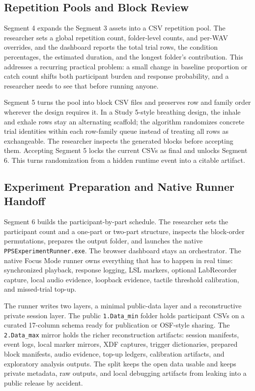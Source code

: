 \documentclass[pdflatex,sn-apa]{sn-jnl}
\newcommand{\code}[1]{\texttt{#1}}
\begin{document}
\subsection{Repetition Pools and Block Review}

Segment 4 expands the Segment 3 assets into a CSV repetition pool. The researcher sets a global repetition count, folder-level counts, and per-WAV overrides, and the dashboard reports the total trial rows, the condition percentages, the estimated duration, and the longest folder's contribution. This addresses a recurring practical problem: a small change in baseline proportion or catch count shifts both participant burden and response probability, and a researcher needs to see that before running anyone.

Segment 5 turns the pool into block CSV files and preserves row and family order wherever the design requires it. In a Study 5-style breathing design, the inhale and exhale rows stay an alternating scaffold; the algorithm randomizes concrete trial identities within each row-family queue instead of treating all rows as exchangeable. The researcher inspects the generated blocks before accepting them. Accepting Segment 5 locks the current CSVs as final and unlocks Segment 6. This turns randomization from a hidden runtime event into a citable artifact.

\subsection{Experiment Preparation and Native Runner Handoff}

Segment 6 builds the participant-by-part schedule. The researcher sets the participant count and a one-part or two-part structure, inspects the block-order permutations, prepares the output folder, and launches the native \code{PPSExperimentRunner.exe}. The browser dashboard stays an orchestrator. The native Focus Mode runner owns everything that has to happen in real time: synchronized playback, response logging, LSL markers, optional LabRecorder capture, local audio evidence, loopback evidence, tactile threshold calibration, and missed-trial top-up.

The runner writes two layers, a minimal public-data layer and a reconstructive private session layer. The public \code{1.Data\_min} folder holds participant CSVs on a curated 17-column schema ready for publication or OSF-style sharing. The \code{2.Data\_max} mirror holds the richer reconstruction artifacts: session manifests, event logs, local marker mirrors, XDF captures, trigger dictionaries, prepared block manifests, audio evidence, top-up ledgers, calibration artifacts, and exploratory analysis outputs. The split keeps the open data usable and keeps private metadata, raw outputs, and local debugging artifacts from leaking into a public release by accident.
\end{document}
